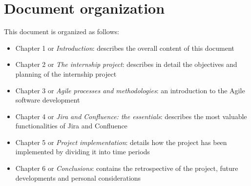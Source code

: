 \section{Document organization}
	This document is organized as follows:
	\begin{itemize}
		\item Chapter 1 or \textit{Introduction}: describes the overall content of this document
		\item Chapter 2 or \textit{The internship project}: describes in detail the objectives and planning of the internship project
		\item Chapter 3 or \textit{Agile processes and methodologies}: an introduction to the Agile software development
		\item Chapter 4 or \textit{Jira and Confluence: the essentials}: describes the most valuable functionalities of Jira and Confluence
		\item Chapter 5 or \textit{Project implementation}: details how the project has been implemented by dividing it into time periods
		\item Chapter 6 or \textit{Conclusions}: contains the retrospective of the project, future developments and personal considerations
	\end{itemize}
